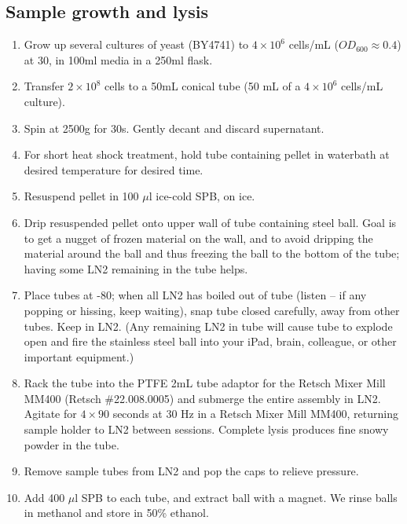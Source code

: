\documentclass{article}
\newcommand{\mul}{\ensuremath{\mu}l }
\begin{document}
\subsection*{Sample growth and lysis}
\begin{enumerate}[resume]
\item Grow up several cultures of yeast (BY4741) to $4 \times 10^6$ cells/mL ($OD_{600} \approx 0.4$) at 30\celsius, in 100ml media in a 250ml flask. 
%
\item Transfer $2 \times 10^8$ cells to a 50mL conical tube (50 mL of a $4 \times 10^6$ cells/mL culture). 
\item Spin at 2500g for 30s. Gently decant and discard supernatant.
\item For short heat shock treatment, hold tube containing pellet in waterbath at desired temperature for desired time. 
\item Resuspend pellet in 100 \mul  ice-cold SPB, on ice.
\item Drip resuspended pellet onto upper wall of tube containing steel ball. Goal is to get a nugget of frozen material on the wall, and to avoid dripping the material around the ball and thus freezing the ball to the bottom of the tube; having some LN2 remaining in the tube helps.
\item Place tubes at -80\celsius; when all LN2 has boiled out of tube (listen -- if any popping or hissing, keep waiting), snap tube closed carefully, away from other tubes. Keep in LN2. (Any remaining LN2 in tube will cause tube to explode open and fire the stainless steel ball into your iPad, brain, colleague, or other important equipment.)
\item Rack the tube into the PTFE 2mL tube adaptor for the Retsch Mixer Mill MM400 (Retsch \#22.008.0005) and submerge the entire assembly in LN2.
Agitate for $4\times 90$ seconds at 30 Hz in a Retsch Mixer Mill MM400, returning sample holder to LN2 between sessions. Complete lysis produces fine snowy powder in the tube.
\item Remove sample tubes from LN2 and pop the caps to relieve pressure.
\item Add 400 \mul SPB to each tube, and extract ball with a magnet. We rinse balls in methanol and store in 50\% ethanol.
\end{enumerate}
\end{document}
